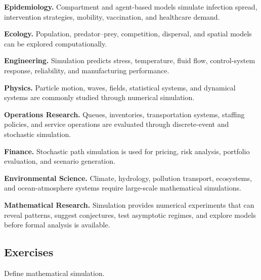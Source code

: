 \begin{applicationbox}

\textbf{Epidemiology.}
Compartment and agent-based models simulate infection spread, intervention
strategies, mobility, vaccination, and healthcare demand.

\medskip

\textbf{Ecology.}
Population, predator--prey, competition, dispersal, and spatial models can
be explored computationally.

\medskip

\textbf{Engineering.}
Simulation predicts stress, temperature, fluid flow, control-system
response, reliability, and manufacturing performance.

\medskip

\textbf{Physics.}
Particle motion, waves, fields, statistical systems, and dynamical systems
are commonly studied through numerical simulation.

\medskip

\textbf{Operations Research.}
Queues, inventories, transportation systems, staffing policies, and
service operations are evaluated through discrete-event and stochastic
simulation.

\medskip

\textbf{Finance.}
Stochastic path simulation is used for pricing, risk analysis, portfolio
evaluation, and scenario generation.

\medskip

\textbf{Environmental Science.}
Climate, hydrology, pollution transport, ecosystems, and ocean-atmosphere
systems require large-scale mathematical simulations.

\medskip

\textbf{Mathematical Research.}
Simulation provides numerical experiments that can reveal patterns,
suggest conjectures, test asymptotic regimes, and explore models before
formal analysis is available.

\end{applicationbox}

\subsection{Exercises}
\label{subsec:mathematical-simulation-exercises}

\begin{exercise}[1]
Define mathematical simulation.
\end{exercise}

